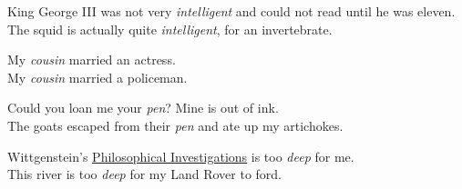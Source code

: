 {\ea\ea King George III was not very \textit{intelligent} and could not read until he was eleven.
\ex The squid is actually quite \textit{intelligent}, for an invertebrate.
\z\z

\ea\ea My \textit{cousin} married an actress.\\
\ex My \textit{cousin} married a policeman.
\z\z

\newpage 
\ea\ea Could you loan me your \textit{pen}? Mine is out of ink.\\
\ex The goats escaped from their \textit{pen} and ate up my artichokes.
\z\z

  
\ea\ea Wittgenstein’s \href{http://en.wikipedia.org/wiki/Philosophical_Investigations}{Philosophical Investigations} is too \textit{deep} for me.\\
\ex This river is too \textit{deep} for my Land Rover to ford.
\z\z
}

